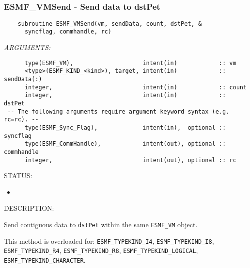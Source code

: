  
\mbox{}\hrulefill\ 
 
\subsubsection [ESMF\_VMSend] {ESMF\_VMSend - Send data to dstPet}


  
\begin{verbatim}    subroutine ESMF_VMSend(vm, sendData, count, dstPet, &
      syncflag, commhandle, rc)\end{verbatim}{\em ARGUMENTS:}
\begin{verbatim}      type(ESMF_VM),                    intent(in)            :: vm
      <type>(ESMF_KIND_<kind>), target, intent(in)            :: sendData(:)  
      integer,                          intent(in)            :: count
      integer,                          intent(in)            :: dstPet
 -- The following arguments require argument keyword syntax (e.g. rc=rc). --
      type(ESMF_Sync_Flag),             intent(in),  optional :: syncflag
      type(ESMF_CommHandle),            intent(out), optional :: commhandle
      integer,                          intent(out), optional :: rc           \end{verbatim}
{\sf STATUS:}
   \begin{itemize}
   \item{}
   \end{itemize}
  
{\sf DESCRIPTION:\\ }


     Send contiguous data to {\tt dstPet} within the same {\tt ESMF\_VM} object.
  
     This method is overloaded for:
     {\tt ESMF\_TYPEKIND\_I4}, {\tt ESMF\_TYPEKIND\_I8},
     {\tt ESMF\_TYPEKIND\_R4}, {\tt ESMF\_TYPEKIND\_R8}, 
     {\tt ESMF\_TYPEKIND\_LOGICAL}, 
     {\tt ESMF\_TYPEKIND\_CHARACTER}.
  
